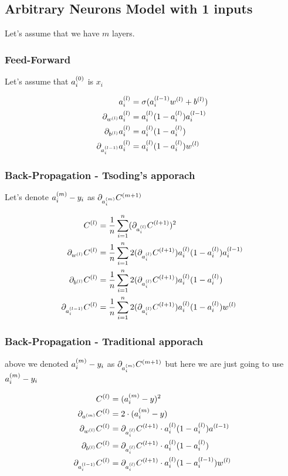 \documentclass{article}
\begin{document}
\subsection{Arbitrary Neurons Model with 1 inputs}

Let's assume that we have $m$ layers.

\subsubsection{Feed-Forward}

Let's assume that $a_i\s[0]$ is $x_i$

\begin{align}
    a_i\s[l] &= \sigma(a_i\s[l-1]w\s[l] + b\s[l]) \\
    \pd[{w\s[l]}]a_i\s[l] &= a_i\s[l](1 - a_i\s[l])a_i\s[l-1] \\
    \pd[{b\s[l]}]a_i\s[l] &= a_i\s[l](1 - a_i\s[l]) \\
    \pd[{a_i\s[l-1]}]a_i\s[l] &= a_i\s[l](1 - a_i\s[l])w\s[l]
\end{align}
\pagebreak
\subsubsection{Back-Propagation - Tsoding's apporach}

Let's denote $a_i\s[m] - y_i$ as $\pd[{a_i\s[m]}]C\s[m+1]$

\begin{align}
    C\s[l]
        &= \avgsum[i, n] (\pd[{a_i\s[l]}]C\s[l+1])^2 \\
    \pd[{w\s[l]}]C\s[l]
        &= \avgsum[i, n] 2(\pd[{a_i\s[l]}]C\s[l+1]) a_i\s[l](1 - a_i\s[l])a_i\s[l-1] \\
    \pd[{b\s[l]}]C\s[l]
        &= \avgsum[i, n] 2(\pd[{a_i\s[l]}]C\s[l+1]) a_i\s[l](1 - a_i\s[l]) \\
    \pd[{a_i\s[l-1]}] C\s[l]
        &= \avgsum[i, n] 2(\pd[{a_i\s[l]}]C\s[l+1])a_i\s[l](1 - a_i\s[l])w\s[l]
\end{align}

\pagebreak
\subsubsection{Back-Propagation - Traditional apporach}

above we denoted $a_i\s[m] - y_i$ as $\pd[{a_i\s[m]}]C\s[m+1]$ but here we are just going to use $a_i\s[m] - y_i$

\begin{align}
    C\s[l]
        &= (a_i\s[m] - y)^2\\
    \pd[{a\s[m]}]C\s[l]
        &= 2 \cdot (a_i\s[m] - y)\\
    \pd[{w\s[l]}]C\s[l]
        &= \pd[{a_i\s[l]}]C\s[l+1] \cdot a_i\s[l](1 - a_i\s[l])a\s[l-1] \\
    \pd[{b\s[l]}]C\s[l]
        &= \pd[{a_i\s[l]}]C\s[l+1] \cdot a_i\s[l](1 - a_i\s[l]) \\
    \pd[{a_i\s[l-1]}] C\s[l]
        &= \pd[{a_i\s[l]}]C\s[l+1] \cdot a_i\s[l](1 - a_i\s[l-1])w\s[l] \\
\end{align}
\end{document}
